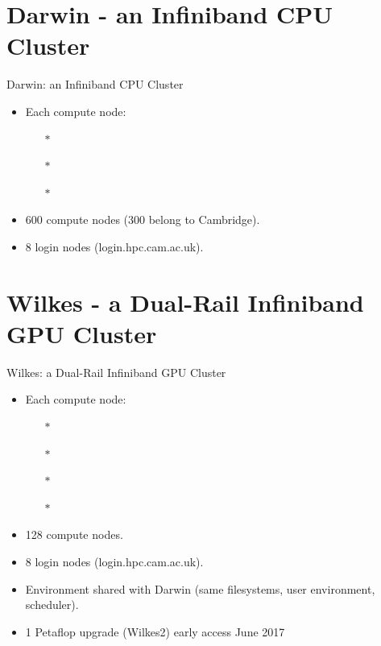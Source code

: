 \section{Darwin - an Infiniband CPU Cluster}
\begin{frame}{Darwin: an Infiniband CPU Cluster}
\begin{itemize}
\item{Each compute node:}
\begin{itemize}
\item[$\ast$]{}
\item[$\ast$]{}
\item[$\ast$]{}
\end{itemize}
\item{600 compute nodes (300 belong to Cambridge).}
\item{8 login nodes (\alert{login.hpc.cam.ac.uk}).}
\end{itemize}
\end{frame}

\section{Wilkes - a Dual-Rail Infiniband GPU Cluster}
\begin{frame}{Wilkes: a Dual-Rail Infiniband GPU Cluster}
\begin{itemize}
\item{Each compute node:}
\begin{itemize}
\item[$\ast$]{}
\item[$\ast$]{}
\item[$\ast$]{}
\item[$\ast$]{}
\end{itemize}
\item{128 compute nodes.}
\item{8 login nodes (\alert{login.hpc.cam.ac.uk}).}
\item<3->{Environment shared with Darwin (same filesystems, user environment, scheduler).}
\item<4->{\alert{1 Petaflop upgrade (Wilkes2) early access June 2017}}
\end{itemize}
\end{frame}

